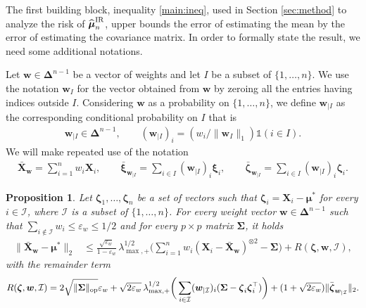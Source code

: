 \documentclass[aos,preprint,reqno]{imsart}
\newcommand\bs{\boldsymbol}
\newcommand\bmu{\boldsymbol\mu}
\newcommand\bxi{\boldsymbol\xi}
\newcommand\bzeta{\boldsymbol\zeta}
\newcommand\bSigma{\boldsymbol\Sigma}
\newcommand\bw{\boldsymbol w}
\def\hat{\widehat}
\theoremstyle{plain}
\newtheorem{proposition}{Proposition}
\theoremstyle{remark}
\begin{document}
	The first building block, inequality \eqref{main:ineq}, 
	used in Section \ref{sec:method} to analyze the risk of 
	$\hat{\bmu}^{\textup{IR}}_n$, upper bounds the error 
	of estimating the mean by the error of estimating
	the covariance matrix. In order to formally state 
	the result, we need some additional notations.
	
	Let $\bw\in\bs\Delta^{n-1}$ be a vector of weights 
	and let $I$ be a subset of $\{1,\ldots,n\}$. We use 
	the notation $\bw_{I}$ for the vector obtained from 
	$\bw$ by zeroing all the entries having indices outside 
	$I$. Considering $\bw$ as a probability on $\{1,\ldots, 
	n\}$, we define $\bw_{|I}$ as the corresponding 
	conditional probability on $I$ that is 
	\begin{align}
	\bw_{|I}\in \bs\Delta^{n-1},\qquad
	(\bw_{|I})_i = (w_i/ \|\bw_{I}\|_1) 
	\mathds 1(i\in I).
	\end{align}
	We will make repeated use of the notation
	\begin{align}
			\bar{\bs X}_{\bw} = \sum_{i=1}^n w_i \bs X_i,\qquad     
			\bar{\bxi}_{\bw_{|I}} = \sum_{i\in I} 
			(\bw_{|I})_i \bxi_i,\qquad
			\bar{\bzeta}_{\bw_{|I}} = \sum_{i\in I} 
			(\bw_{|I})_i \bzeta_i.
	\end{align}

	\begin{proposition}\label{proposition1}
	Let $\bzeta_1,\ldots,\bzeta_n$ be a set of vectors such 
	that $\bzeta_i = \bs X_i-\bmu^*$ for every $i\in \mathcal I$, 
	where $\mathcal I$ is a subset of $\{1,\ldots,n\}$. For every 
	weight vector $\bw\in \bs \Delta^{n-1}$ such that 
	$\sum_{i\not\in \mathcal I} w_i\le \varepsilon_{w}\le 1/2$ and 
	for every $p\times p$ matrix $\bSigma$, it holds  
	\begin{align}
	\|\bar{\bs X}_{\bw} - {\bmu}^*\|_2 
		&\le \frac{\sqrt{\varepsilon_{w}}}{1-\varepsilon_{w}}\,
			\lambda_{\max,+}^{1/2}\Big(\sum_{i=1}^n  w_i(\bs X_i - 
			\bar{\bs X}_{\bw})^{\otimes 2} 
			- \bSigma\Big) + R(\bzeta,\bw,\mathcal I),
	\end{align}
	with the remainder term
	\begin{align}
	R(\bzeta,\bw,\mathcal I) 
		= 2\sqrt{\|\bSigma\|_{\rm op}}\varepsilon_{w}+\sqrt{2\varepsilon_{w}}\,
		\lambda_{\max,+}^{1/2}
		\bigg(\sum_{i\in \mathcal I} (\bw_{|\mathcal I})_i (\bSigma - 
		\bzeta_i\bzeta_i^\top)\bigg) + (1+\sqrt{2\varepsilon_{w}}) 
		\|\bar{\bzeta}_{\bw_{|\mathcal I}}\|_2.
	\end{align}
	\end{proposition}
\end{document}
